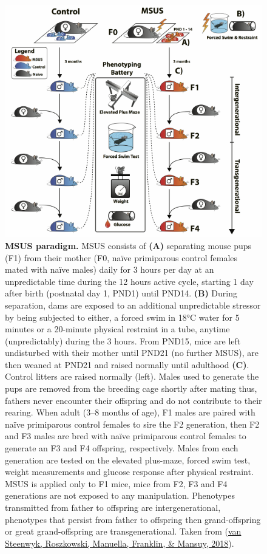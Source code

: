 \documentclass[12pt,twoside]{reedthesis}
\begin{document}
\begin{figure}[htbp]

{\centering \includegraphics{thesis_files/figure-latex/if4-1} 

}

\caption[MSUS paradigm]{\textbf{MSUS paradigm.} MSUS consists of \textbf{(A)} separating mouse pups (F1) from their mother (F0, naïve primiparous control females mated with naïve males) daily for 3 hours per day at an unpredictable time during the 12 hours active cycle, starting 1 day after birth (postnatal day 1, PND1) until PND14. \textbf{(B)} During separation, dams are exposed to an additional unpredictable stressor by being subjected to either, a forced swim in 18°C water for 5 minutes or a 20-minute physical restraint in a tube, anytime (unpredictably) during the 3 hours. From PND15, mice are left undisturbed with their mother until PND21 (no further MSUS), are then weaned at PND21 and raised normally until adulthood \textbf{(C)}. Control litters are raised normally (left). Males used to generate the pups are removed from the breeding cage shortly after mating thus, fathers never encounter their offspring and do not contribute to their rearing. When adult (3--8 months of age), F1 males are paired with naïve primiparous control females to sire the F2 generation, then F2 and F3 males are bred with naïve primiparous control females to generate an F3 and F4 offspring, respectively. Males from each generation are tested on the elevated plus-maze, forced swim test, weight measurements and glucose response after physical restraint. MSUS is applied only to F1 mice, mice from F2, F3 and F4 generations are not exposed to any manipulation. Phenotypes transmitted from father to offspring are intergenerational, phenotypes that persist from father to offspring then grand-offspring or great grand-offspring are transgenerational. Taken from (\protect\hyperlink{ref-vansteenwyk2018}{van Steenwyk, Roszkowski, Manuella, Franklin, \& Mansuy, 2018}).}\label{fig:if4}
\end{figure}
\end{document}
